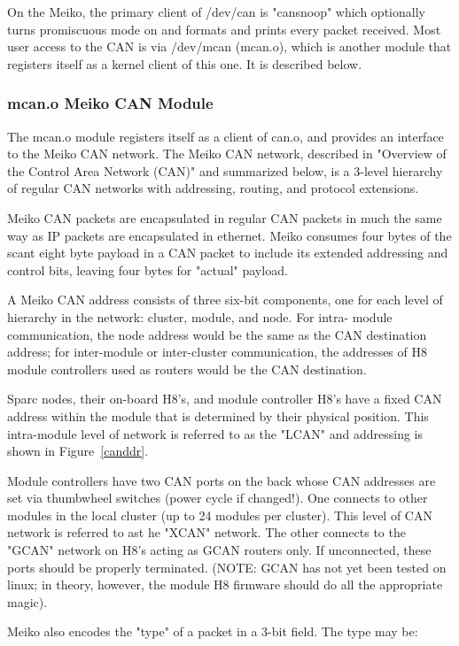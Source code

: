 \documentclass{article}
\begin{document}
  On the Meiko, the primary client of /dev/can is "cansnoop" which optionally
turns promiscuous mode on and formats and prints every packet received.
Most user access to the CAN is via /dev/mcan (mcan.o), which is another module 
that registers itself as a kernel client of this one.  It is described below.


\subsubsection{mcan.o Meiko CAN Module}

  The mcan.o module registers itself as a client of can.o, and provides an
interface to the Meiko CAN network.  The Meiko CAN network, described in
"Overview of the Control Area Network (CAN)" and summarized below, is a 
3-level hierarchy of regular CAN networks with addressing, routing, and 
protocol extensions.

  Meiko CAN packets are encapsulated in regular CAN packets in much the same
way as IP packets are encapsulated in ethernet.  Meiko consumes four bytes
of the scant eight byte payload in a CAN packet to include its extended 
addressing and control bits, leaving four bytes for "actual" payload.

  A Meiko CAN address consists of three six-bit components, one for each 
level of hierarchy in the network:  cluster, module, and node.  For intra-
module communication, the node address would be the same as the CAN destination
address;  for inter-module or inter-cluster communication, the addresses of
H8 module controllers used as routers would be the CAN destination.

  Sparc nodes, their on-board H8's, and module controller H8's have a fixed 
CAN address within the module that is determined by their physical position.  
This intra-module level of network is referred to as the "LCAN" and addressing
is shown in Figure~\ref{canddr}.

  Module controllers have two CAN ports on the back whose CAN addresses are set
via thumbwheel switches (power cycle if changed!).  One connects to other 
modules in the local cluster (up to 24 modules per cluster).  This level of
CAN network is referred to ast he "XCAN" network.  The other connects to the
"GCAN" network on H8's acting as GCAN routers only.  If unconnected, these
ports should be properly terminated.  (NOTE:  GCAN has not yet been tested
on linux;  in theory, however, the module H8 firmware should do all the
appropriate magic).

Meiko also encodes the "type" of a packet in a 3-bit field.  The type may be:
\end{document}
